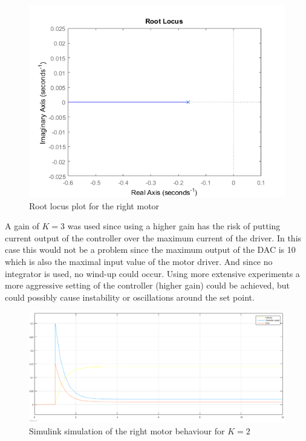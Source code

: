 \begin{figure}[htbp]
\centering
\includegraphics[width = \textwidth]{pics/RM_rlocus.png}
\caption{Root locus plot for the right motor}
\label{fig:RM_rlocus}
\end{figure}



A gain of $K = 3$ was used since using a higher gain has the risk of putting current output of the controller over the maximum current of the driver. In this case this would not be a problem since the maximum output of the DAC is 10 which is also the maximal input value of the motor driver. And since no integrator is used, no wind-up could occur. Using more extensive experiments a more aggressive setting of the controller (higher gain) could be achieved, but could possibly cause instability or oscillations around the set point.

\begin{figure}[htbp]
\centering
\includegraphics[width = \textwidth]{pics/RM_K2_SIM.png}
\caption{Simulink simulation of the right motor behaviour for $K = 2$}
\label{fig:RM_K2_SIM}
\end{figure}

